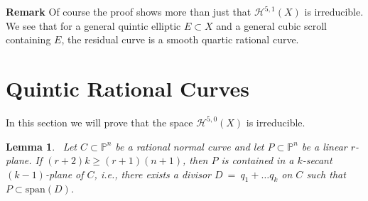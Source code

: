 \documentclass[twoside,12pt,reqno]{amsart}
\theoremstyle{plain}
\newtheorem{lem}[thm]{Lemma}
\theoremstyle{definition}
\newcommand{\Hdg}[2]{\mathcal{H}^{#1,#2}}
\newcommand{\PP}{\mathbb{P}}
\def\ps{\vspace{4pt}}
\begin{document}
\textbf{Remark}  Of course the proof shows more than just that
$\Hdg{5}{1}(X)$ is irreducible.  We see that for a general quintic elliptic
$E\subset X$ and a general cubic scroll containing $E$, the residual
curve is a smooth quartic rational curve.  

\section{Quintic Rational Curves}

In this section we will prove that the space $\Hdg{5}{0}(X)$ is
irreducible.
\ps

\begin{lem}~\label{lem-rncsec}  Let $C\subset\PP^n$ be a rational
normal curve and let $P\subset \PP^n$ be a linear $r$-plane.
If $(r+2)k\geq (r+1)(n+1)$, then $P$ is contained in a
$k$-secant $(k-1)$-plane of $C$, i.e., there
exists a divisor $D~=~q_1+\dots q_k$ on $C$ such that
$P\subset \text{span}(D)$.
\end{lem}
\end{document}
